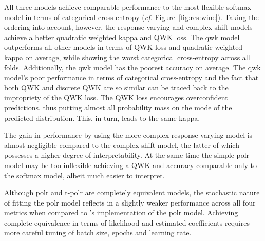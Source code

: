 \documentclass[article,nojss,shortnames]{jss}\usepackage[]{graphicx}\usepackage[]{color}
\begin{document}
All three  models achieve comparable performance to the most flexible
softmax model in terms of categorical cross-entropy (\emph{cf.} Figure~\ref{fig:res:wine}).
Taking the ordering into account, however, the response-varying and complex shift
 models achieve a better quadratic weighted kappa and QWK loss.
The qwk model outperforms all other models in terms of QWK loss and quadratic
weighted kappa on average, while showing the worst categorical cross-entropy
across all folds. Additionally, the qwk model has the poorest accuracy on average.
The qwk model's poor performance in terms of categorical cross-entropy and the
fact that both QWK and discrete QWK are so similar can be traced back to the
impropriety of the QWK loss. The QWK loss encourages overconfident predictions,
thus putting almost all probability mass on the mode of the predicted distribution.
This, in turn, leads to the same kappa.

The gain in performance by using the more complex response-varying model is almost
negligible compared to the complex shift model, the latter of which possesses a
higher degree of interpretability. At the same time the simple polr model may
be too inflexible achieving a QWK and accuracy comparable only to the softmax model,
albeit much easier to interpret.

Although polr and t-polr are completely equivalent models, the stochastic nature
of fitting the  polr model reflects in a slightly weaker performance
across all four metrics when compared to 's implementation of the polr
model. Achieving complete equivalence in terms of likelihood and estimated coefficients
requires more careful tuning of batch size, epochs and learning rate.
\end{document}
